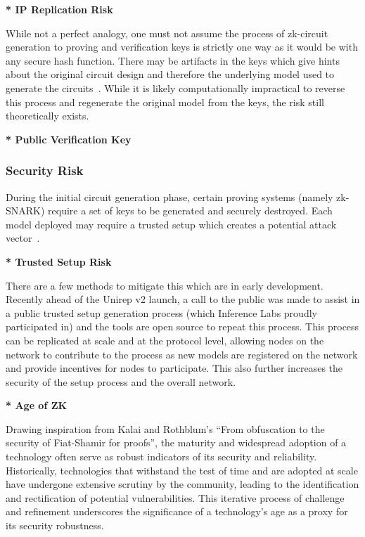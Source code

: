 \documentclass[conference]{IEEEtran}
\begin{document}
\textbf{* IP Replication Risk}

While not a perfect analogy, one must not assume the process of zk-circuit generation to proving and veriﬁcation keys is strictly one way as it would be with any secure hash function. There may be artifacts in the keys which give hints about the original circuit design and therefore the underlying model used to generate the circuits~\cite{BenSasson2014SuccinctNZ}. While it is likely computationally impractical to reverse this process and regenerate the original model from the keys, the risk still theoretically exists.

\textbf{* Public Veriﬁcation Key}

\subsubsection{Security Risk}

During the initial circuit generation phase, certain proving systems (namely zk-SNARK) require a set of keys to be generated and securely destroyed. Each model deployed may require a trusted setup which creates a potential attack vector~\cite{Bowe2017ScalableMC}.

\textbf{* Trusted Setup Risk}

There are a few methods to mitigate this which are in early development. Recently ahead of the Unirep v2 launch, a call to the public was made to assist in a public trusted setup generation process (which Inference Labs proudly participated in) and the tools are open source to repeat this process. This process can be replicated at scale and at the protocol level, allowing nodes on the network to contribute to the process as new models are registered on the network and provide incentives for nodes to participate. This also further increases the security of the setup process and the overall network.


\textbf{* Age of ZK}

Drawing inspiration from Kalai and Rothblum’s “From obfuscation to the security of Fiat-Shamir for proofs”, the maturity and widespread adoption of a technology often serve as robust indicators of its security and reliability. Historically, technologies that withstand the test of time and are adopted at scale have undergone extensive scrutiny by the community, leading to the identiﬁcation and rectiﬁcation of potential vulnerabilities. This iterative process of challenge and reﬁnement underscores the signiﬁcance of a technology’s age as a proxy for its security robustness.
\end{document}

